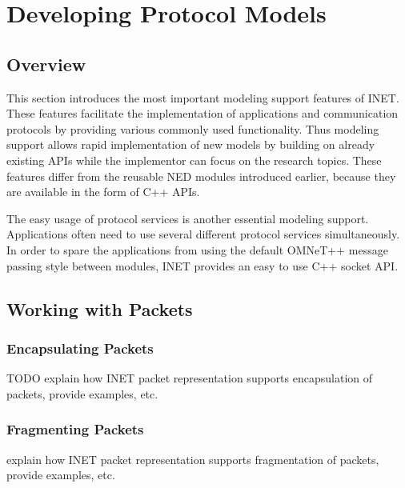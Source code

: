 \chapter{Developing Protocol Models}
\label{cha:developing-protocol-models}

\section{Overview}

This section introduces the most important modeling support features of
INET. These features facilitate the implementation of applications and
communication protocols by providing various commonly used functionality.
Thus modeling support allows rapid implementation of new models by building
on already existing APIs while the implementor can focus on the research
topics. These features differ from the reusable NED modules introduced
earlier, because they are available in the form of C++ APIs.

The easy usage of protocol services is another essential modeling support.
Applications often need to use several different protocol services
simultaneously. In order to spare the applications from using the default
OMNeT++ message passing style between modules, INET provides an easy to use
C++ socket API.

\section{Working with Packets}

\subsection{Encapsulating Packets}

TODO explain how INET packet representation supports encapsulation of packets, provide examples, etc.



\subsection{Fragmenting Packets}

explain how INET packet representation supports fragmentation of packets, provide examples, etc.


